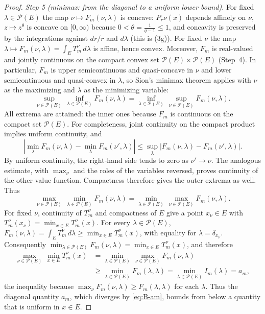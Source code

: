 \documentclass[12pt,oneside,a4paper]{article}
\theoremstyle{mytheorem}
\theoremstyle{remark}
\theoremstyle{definition}
\begin{document}
\begin{proof}
\smallskip\noindent\emph{Step 5 (minimax: from the diagonal to a
uniform lower bound).}
For fixed $\lambda\in\mathcal{P}(E)$ the map $\nu\mapsto F_m(\nu,\lambda)$
is concave: $P_r\nu(x)$ depends affinely on $\nu$, $z\mapsto z^\theta$
is concave on $[0,\infty)$ because $0<\theta=\frac1{q-1}\le1$, and
concavity is preserved by the integrations against $dr/r$ and $d\lambda$
(this is (3g)).  For fixed $\nu$ the map
$\lambda\mapsto F_m(\nu,\lambda)=\int_ET^\nu_m\,d\lambda$ is affine,
hence convex.  Moreover, $F_m$ is real-valued and jointly continuous
on the compact convex set $\mathcal{P}(E)\times\mathcal{P}(E)$ (Step~4).
In particular, $F_m$ is upper semicontinuous and quasi-concave in $\nu$
and lower semicontinuous and quasi-convex in $\lambda$, so Sion's
minimax theorem \cite[Theorem~3.4]{zbMATH03133049} applies with $\nu$ as
the maximizing and $\lambda$ as the minimizing variable:
\[
 \sup_{\nu\in\mathcal{P}(E)}\,\inf_{\lambda\in\mathcal{P}(E)}F_m(\nu,\lambda)
 =\inf_{\lambda\in\mathcal{P}(E)}\,\sup_{\nu\in\mathcal{P}(E)}F_m(\nu,\lambda).
\]
All extrema are attained: the inner ones because $F_m$ is continuous
on the compact set $\mathcal{P}(E)$.  For completeness, joint continuity
on the compact product implies uniform continuity, and
\[
\left|\min_\lambda F_m(\nu,\lambda)
      -\min_\lambda F_m(\nu',\lambda)\right|
\leq
\sup_\lambda|F_m(\nu,\lambda)-F_m(\nu',\lambda)|.
\]
By uniform continuity, the right-hand side tends to zero as
\(\nu'\to\nu\).  The analogous estimate, with \(\max_\nu\) and the roles of
the variables reversed, proves continuity of the other value function.
Compactness therefore gives the outer extrema as well.  Thus
\[
 \max_{\nu\in\mathcal{P}(E)}\,\min_{\lambda\in\mathcal{P}(E)}F_m(\nu,\lambda)
 =\min_{\lambda\in\mathcal{P}(E)}\,\max_{\nu\in\mathcal{P}(E)}F_m(\nu,\lambda).
\]
For fixed $\nu$, continuity of $T^\nu_m$ and compactness of $E$ give a
point $x_\nu\in E$ with $T^\nu_m(x_\nu)=\min_{x\in E}T^\nu_m(x)$.  For
every $\lambda\in\mathcal{P}(E)$,
\(F_m(\nu,\lambda)=\int_ET^\nu_m\,d\lambda\ge\min_{x\in E}T^\nu_m(x)\),
with equality for $\lambda=\delta_{x_\nu}$.  Consequently
$\min_{\lambda\in\mathcal{P}(E)}F_m(\nu,\lambda)=\min_{x\in E}T^\nu_m(x)$,
and therefore
\begin{equation}\label{eq:B-minimax}
\begin{aligned}
 \max_{\nu\in\mathcal{P}(E)}\,\min_{x\in E}T^\nu_m(x)
 &=\min_{\lambda\in\mathcal{P}(E)}\,\max_{\nu\in\mathcal{P}(E)}F_m(\nu,\lambda)\\
 &\ge\min_{\lambda\in\mathcal{P}(E)}F_m(\lambda,\lambda)
 =\min_{\lambda\in\mathcal{P}(E)}I_m(\lambda)=a_m,
\end{aligned}
\end{equation}
the inequality because $\max_\nu F_m(\nu,\lambda)\ge F_m(\lambda,\lambda)$
for each $\lambda$.  Thus the diagonal quantity $a_m$, which diverges by
\eqref{eq:B-am}, bounds from below a quantity that is uniform in $x\in E$.


\end{proof}
\end{document}
